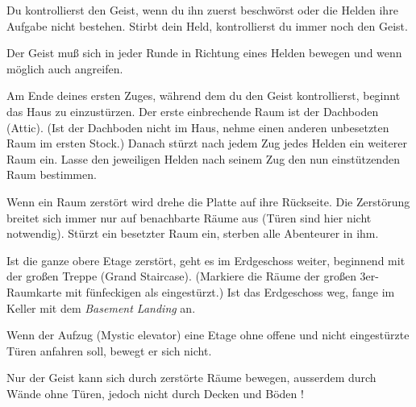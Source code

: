 
  \begin{itemize}
        \bitem Du kontrollierst den Geist, wenn du ihn zuerst beschwörst oder die Helden ihre Aufgabe nicht bestehen. Stirbt dein Held, kontrollierst du immer noch den Geist.

        \bitem Der Geist muß sich in jeder Runde in Richtung eines Helden bewegen und wenn möglich auch angreifen.

        \bitem Am Ende deines ersten Zuges, während dem du den Geist kontrollierst, beginnt das Haus zu einzustürzen. Der erste einbrechende Raum ist der Dachboden (Attic). (Ist der Dachboden nicht im Haus, nehme einen anderen unbesetzten Raum im ersten Stock.) Danach stürzt nach jedem Zug jedes Helden ein weiterer Raum ein. Lasse den jeweiligen Helden nach seinem Zug den nun einstützenden Raum bestimmen.

        \bitem Wenn ein Raum zerstört wird drehe die Platte auf ihre Rückseite. Die Zerstörung breitet sich immer nur auf benachbarte Räume aus (Türen sind hier nicht notwendig). Stürzt ein besetzter Raum ein,  sterben alle Abenteurer in ihm.

        \bitem Ist die ganze obere Etage zerstört, geht es im Erdgeschoss weiter, beginnend mit der großen Treppe (Grand Staircase). (Markiere die Räume der großen 3er-Raumkarte mit fünfeckigen  als eingestürzt.) Ist das Erdgeschoss weg, fange im Keller mit dem \emph{Basement Landing} an.

        \bitem Wenn der Aufzug (Mystic elevator) eine Etage ohne offene und nicht eingestürzte Türen anfahren soll, bewegt er sich nicht.

        \bitem Nur der Geist kann sich durch zerstörte Räume bewegen, ausserdem durch Wände ohne Türen, jedoch nicht durch Decken und Böden !
    \end{itemize}


